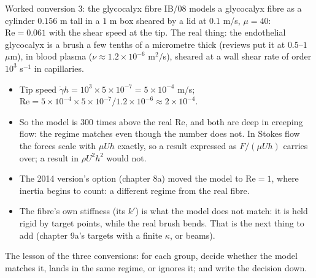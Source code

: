 \documentclass[aspectratio=169,11pt]{beamer}
\begin{document}
\begin{frame}{Worked conversion 3: the glycocalyx fibre}
\label{fr:glyco}
\small IB/08 models a glycocalyx fibre as a cylinder $0.156$ m tall in a $1$ m box sheared by a lid at $0.1$ m/s, $\mu = 40$: $\mathrm{Re} = 0.061$ with the shear speed at the tip. The real thing: the endothelial glycocalyx is a brush a few tenths of a micrometre thick (reviews put it at $0.5$--$1$ $\mu$m), in blood plasma ($\nu \approx 1.2\times10^{-6}$ m$^2$/s), sheared at a wall shear rate of order $10^3$ s$^{-1}$ in capillaries.
\begin{itemize}
  \item Tip speed $\dot\gamma h = 10^3\times5\times10^{-7} = 5\times10^{-4}$ m/s; $\mathrm{Re} = 5\times10^{-4}\times5\times10^{-7}/1.2\times10^{-6} \approx 2\times10^{-4}$.
  \item So the model is $300$ times above the real $\mathrm{Re}$, and both are deep in creeping flow: the regime matches even though the number does not. In Stokes flow the forces scale with $\mu U h$ exactly, so a result expressed as $F/(\mu U h)$ carries over; a result in $\rho U^2 h^2$ would not.
  \item The 2014 version's  option (chapter 8a) moved the model to $\mathrm{Re} = 1$, where inertia begins to count: a different regime from the real fibre.
  \item The fibre's own stiffness (its $k'$) is what the model does not match: it is held rigid by target points, while the real brush bends. That is the next thing to add (chapter 9a's targets with a finite $\kappa$, or beams).
\end{itemize}
\vspace{1mm}
\small The lesson of the three conversions: for each group, decide whether the model matches it, lands in the same regime, or ignores it; and write the decision down.
\end{frame}
\end{document}

